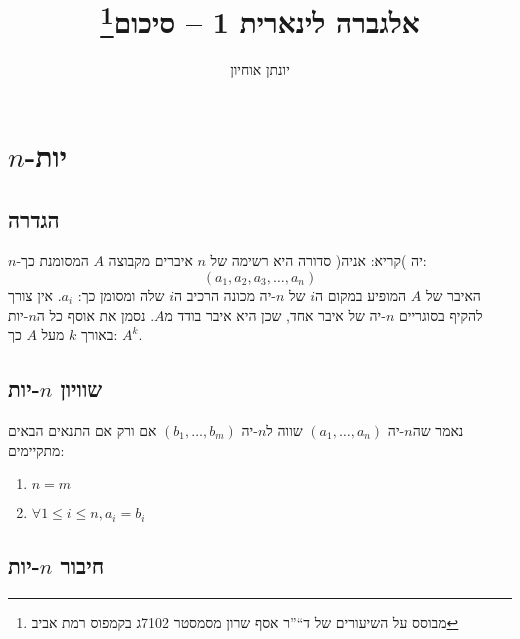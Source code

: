 \documentclass[11pt, oneside]{article}
\title{אלגברה לינארית 1 -- סיכום\thanks{מבוסס על השיעורים של ד``''ר אסף שרון מסמסטר 7102ג בקמפוס רמת אביב}}
\author{יונתן אוחיון}
\begin{document}
\maketitle


\clearpage


\clearpage

\section*{$n$-יות}
\subsection*{הגדרה}
$n$-יה )קריא: אניה( סדורה היא רשימה של $n$ איברים מקבוצה $A$ המסומנת כך:
\[
(a_{1}, a_{2}, a_{3}, \ldots, a_{n})
\]
האיבר של $A$ המופיע במקום ה$i$ של $n$-יה מכונה הרכיב ה$i$ שלה ומסומן כך: $a_{i}$. אין צורך להקיף בסוגריים $n$-יה של איבר אחד, שכן היא איבר בודד מ$A$. נסמן את אוסף כל ה$n$-יות באורך $k$ מעל $A$ כך: $A^{k}$.

\subsection*{שוויון $n$-יות}
נאמר שה$n$-יה $(a_{1}, \ldots, a_{n})$ שווה ל$n$-יה $(b_{1}, \ldots, b_{m})$ אם ורק אם התנאים הבאים מתקיימים:
\begin{enumerate}
\item $n = m$
\item $\forall 1 \le i \le n, a_{i} = b_{i}$
\end{enumerate}

\subsection*{חיבור $n$-יות}
\end{document}
